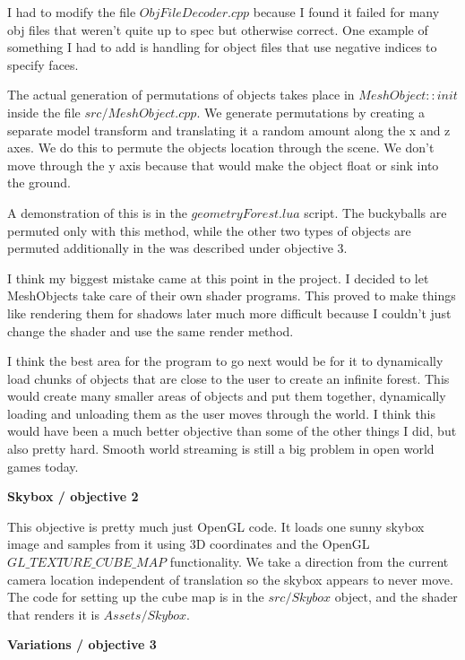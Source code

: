 \documentclass[10pt]{article}
\begin{document}
	I had to modify the file $ObjFileDecoder.cpp$ because I found it failed for many obj files that weren't quite up to spec but otherwise correct. One example of something I had to add is handling for object files that use negative indices to specify faces.
	
	The actual generation of permutations of objects takes place in $MeshObject::init$ inside the file $src/MeshObject.cpp$. We generate permutations by creating a separate model transform and translating it a random amount along the x and z axes. We do this to permute the objects location through the scene. We don't move through the y axis because that would make the object float or sink into the ground.
	
	A demonstration of this is in the $geometryForest.lua$ script. The buckyballs are permuted only with this method, while the other two types of objects are permuted additionally in the was described under objective 3.
	
	I think my biggest mistake came at this point in the project. I decided to let MeshObjects take care of their own shader programs. This proved to make things like rendering them for shadows later much more difficult because I couldn't just change the shader and use the same render method.
	
	I think the best area for the program to go next would be for it to dynamically load chunks of objects that are close to the user to create an infinite forest. This would create many smaller areas of objects and put them together, dynamically loading and unloading them as the user moves through the world. I think this would have been a much better objective than some of the other things I did, but also pretty hard. Smooth world streaming is still a big problem in open world games today.
		
	\begin{center}
		\bf Skybox / objective 2
	\end{center}	
	
	This objective is pretty much just OpenGL code. It loads one sunny skybox image and samples from it using 3D coordinates and the OpenGL $GL\_TEXTURE\_CUBE\_MAP$ functionality. We take a direction from the current camera location independent of translation so the skybox appears to never move. The code for setting up the cube map is in the $src/Skybox$ object, and the shader that renders it is $Assets/Skybox$.
	
	\begin{center}
		\bf Variations / objective 3
	\end{center}
	
\end{document}
